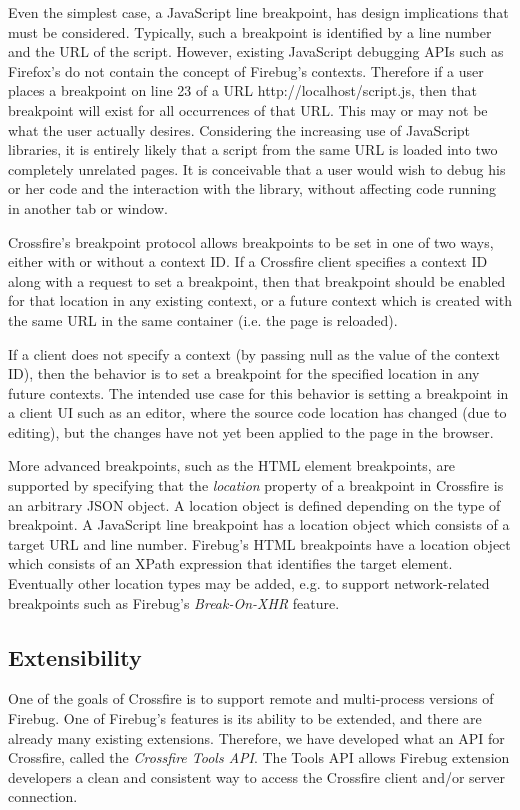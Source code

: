 Even the simplest case, a JavaScript line breakpoint, has design implications
that must be considered. Typically, such a breakpoint is identified by a line
number and the URL of the script. However, existing JavaScript debugging APIs
such as Firefox's do not contain the concept of Firebug's contexts.  Therefore
if a user places a breakpoint on line 23 of a URL http://localhost/script.js,
then that breakpoint will exist for all occurrences of that URL. This may or may
not be what the user actually desires.  Considering the increasing use of
JavaScript libraries, it is entirely likely that a script from the same URL is
loaded into two completely unrelated pages. It is conceivable that a user would
wish to debug his or her code and the interaction with the library, without
affecting code running in another tab or window.

Crossfire's breakpoint protocol allows breakpoints to be set in one of two ways,
either with or without a context ID. If a Crossfire client specifies a context
ID along with a request to set a breakpoint, then that breakpoint should be
enabled for that location in any existing context, or a future context which is
created with the same URL in the same container (i.e. the page is reloaded).

If a client does not specify a context (by passing null as the value of the
context ID), then the behavior is to set a breakpoint for the specified location
in any future contexts. The intended use case for this behavior is setting a
breakpoint in a client UI such as an editor, where the source code location has
changed (due to editing), but the changes have not yet been applied to the page
in the browser.

More advanced breakpoints, such as the HTML element breakpoints, are supported
by specifying that the \textit{location} property of a breakpoint in Crossfire
is an arbitrary JSON object. A location object is defined depending on
the type of breakpoint.  A JavaScript line breakpoint has a location object
which consists of a target URL and line number. Firebug's HTML breakpoints have
a location object which consists of an XPath expression that identifies the
target element.  Eventually other location types may be added, e.g. to support
network-related breakpoints such as Firebug's \textit{Break-On-XHR}
feature\cite{jjb-www2010}.

\subsection {Extensibility}
One of the goals of Crossfire is to support remote and multi-process versions of
Firebug. One of Firebug's features is its ability to be extended, and there are
already many existing extensions. Therefore, we have developed what an API for
Crossfire, called the \textit{Crossfire Tools API}. The Tools API allows Firebug
extension developers a clean and consistent way to access the Crossfire client
and/or server connection.

